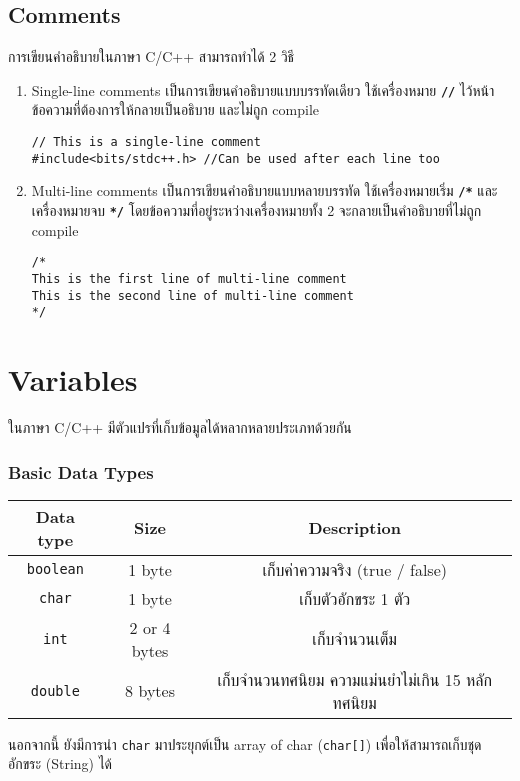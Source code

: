 \subsection{Comments}
การเขียนคำอธิบายในภาษา C/C++ สามารถทำได้ 2 วิธี
\begin{enumerate}
\item Single-line comments เป็นการเขียนคำอธิบายแบบบรรทัดเดียว ใช้เครื่องหมาย \textbf{\texttt{//}} ไว้หน้าข้อความที่ต้องการให้กลายเป็นอธิบาย และไม่ถูก compile 
\begin{lstlisting}
// This is a single-line comment
#include<bits/stdc++.h>	//Can be used after each line too 
\end{lstlisting}
\item Multi-line comments เป็นการเขียนคำอธิบายแบบหลายบรรทัด ใช้เครื่องหมายเริ่ม \textbf{\texttt{/*}} และเครื่องหมายจบ \textbf{\texttt{*/}} โดยข้อความที่อยู่ระหว่างเครื่องหมายทั้ง 2 จะกลายเป็นคำอธิบายที่ไม่ถูก compile
\begin{lstlisting}
/*
This is the first line of multi-line comment
This is the second line of multi-line comment
*/
\end{lstlisting}
\end{enumerate}

\section{Variables}
ในภาษา C/C++ มีตัวแปรที่เก็บข้อมูลได้หลากหลายประเภทด้วยกัน
\subsubsection{Basic Data Types}
\begin{center}
\begin{tabular}{||c|c|c||}
\hline
\textbf{Data type} & \textbf{Size} & \textbf{Description} \\
\hline
\texttt{boolean} & 1 byte & เก็บค่าความจริง (true / false) \\
\texttt{char} & 1 byte & เก็บตัวอักขระ 1 ตัว \\
\texttt{int} & 2 or 4 bytes & เก็บจำนวนเต็ม \\
\texttt{double} & 8 bytes & เก็บจำนวนทศนิยม ความแม่นยำไม่เกิน 15 หลักทศนิยม \\
\hline
\end{tabular}
\end{center}
นอกจากนี้ ยังมีการนำ \texttt{char} มาประยุกต์เป็น array of char (\texttt{char[]}) เพื่อให้สามารถเก็บชุดอักขระ (String) ได้
